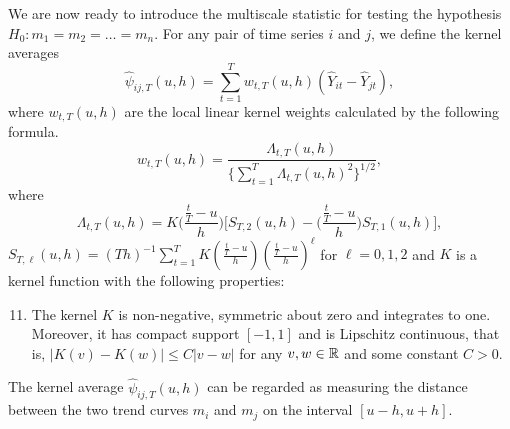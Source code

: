 \documentclass[a4paper,12pt]{article}
\begin{document}
We are now ready to introduce the multiscale statistic for testing the hypothesis $H_0: m_1 = m_2 = \ldots = m_n$. For any pair of time series $i$ and $j$, we define the kernel averages
\[ \widehat{\psi}_{ij,T}(u,h) = \sum\limits_{t=1}^T w_{t,T}(u,h)(\widehat{Y}_{it} - \widehat{Y}_{jt}), \]
where $w_{t,T}(u,h)$ are the local linear kernel weights calculated by the following formula.
\begin{equation}\label{weights}
w_{t,T}(u,h) = \frac{\Lambda_{t,T}(u,h)}{ \{\sum\nolimits_{t=1}^T \Lambda_{t,T}(u,h)^2 \}^{1/2} }, 
\end{equation}
where
\[ \Lambda_{t,T}(u,h) = K\Big(\frac{\frac{t}{T}-u}{h}\Big) \Big[ S_{T,2}(u,h) - \Big(\frac{\frac{t}{T}-u}{h}\Big) S_{T,1}(u,h) \Big], \]
$S_{T,\ell}(u,h) = (Th)^{-1} \sum\nolimits_{t=1}^T K(\frac{\frac{t}{T}-u}{h}) (\frac{\frac{t}{T}-u}{h})^\ell$ for $\ell = 0,1,2$ and $K$ is a kernel function with the following properties: 
\begin{enumerate}[label=(C\arabic*),leftmargin=1.05cm]
\setcounter{enumi}{10}
\item \label{C-ker} The kernel $K$ is non-negative, symmetric about zero and integrates to one. Moreover, it has compact support $[-1,1]$ and is Lipschitz continuous, that is, $|K(v) - K(w)| \le C |v-w|$ for any $v,w \in \mathbb{R}$ and some constant $C > 0$. 
\end{enumerate} 
The kernel average $\widehat{\psi}_{ij,T}(u,h)$ can be regarded as measuring the distance between the two trend curves $m_i$ and $m_j$ on the interval $[u-h,u+h]$.
\end{document}
